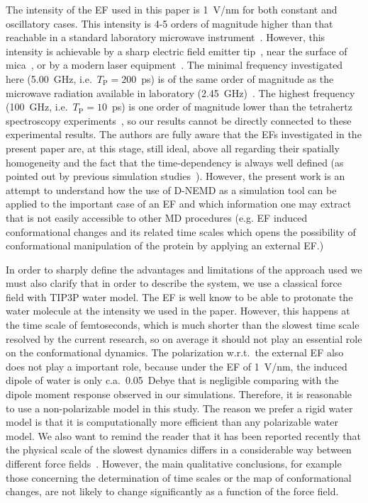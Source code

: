 \documentclass[journal=jctcce,manuscript=manuscript]{achemso}
\newcommand{\period}[0]{T_{\textrm{P}}}
\begin{document}
The intensity of the EF used in this paper is 1~V/nm for both constant
and oscillatory cases. This intensity is 4-5 orders of magnitude
higher than that reachable in a standard laboratory microwave
instrument~\cite{damm2012can}. However, this intensity is achievable
by a sharp electric field emitter tip~\cite{scovell2000phase}, near
the surface of mica~\cite{starzyk2013proteins}, or by a modern laser
equipment~\cite{vogel2008femtosecond}.
{The minimal frequency investigated here (5.00~GHz, i.e.~$\period = 200$~ps)
is of the same order of magnitude as the microwave
radiation available in laboratory (2.45~GHz)~\cite{damm2012can}.
The highest frequency (100~GHz, i.e.~$\period = 10$~ps) is
one order of magnitude lower than the tetrahertz spectroscopy experiments~\cite{plusquellic2007applications, born2009terahertz},
so our results cannot be directly connected to these experimental results.}
The authors are fully aware
that the EFs investigated in the present paper are, at this stage, still ideal, above all regarding their spatially homogeneity and
  the fact that the time-dependency is always well defined (as pointed
out by previous simulation studies~\cite{budi2005electric,
  budi2007effect, budi2008comparative, toschi2008effects,
  astrakas2011electric, astrakas2012structural, damm2012can,
  starzyk2013proteins, english2009nonequilibrium,
  solomentsev2012effects}). However, the present work is an attempt to understand how the use of D-NEMD as a simulation tool can be applied to the important case of an EF and which information one may extract that is not easily accessible to other MD procedures (e.g.  EF induced conformational changes and its related time scales which opens the
possibility of conformational manipulation of the protein by applying
an external EF.)

In order to sharply define the advantages and limitations of the approach used we must also clarify that in order to describe the system, we use a classical force field with TIP3P water model.
The EF is well know to be able to protonate the water molecule at the
intensity we used in the paper. However, this happens at the time
scale of femtoseconds, which is much shorter than the slowest time
scale resolved by the current research, so on average it should not play an essential role on the conformational dynamics.
The polarization w.r.t.~the external EF also does
not play a important role, because  under the EF of 1~V/nm, the induced dipole
of water is only c.a.~0.05~Debye that is negligible comparing with the
dipole moment response observed in our simulations.  Therefore, it is
reasonable to use a non-polarizable model in this study.  The reason we
prefer a rigid water model is that it is computationally more
efficient than any polarizable water model.  We also want to remind
the reader that it has been reported recently that the physical scale of the slowest
dynamics differs in a considerable way between different force
fields~\cite{vitalini2013speed}. However, the main qualitative conclusions, for
example those concerning the determination of time scales or the map of conformational changes, 
are not likely to change significantly as a function of the force field.
\end{document}

